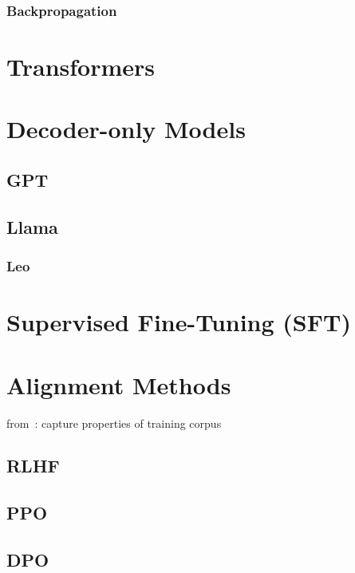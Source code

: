 \subsubsection{Backpropagation}

\section{Transformers}\label{sec:trans}

\section{Decoder-only Models}\label{sec:decoder}

\subsection{GPT}\label{subsec:gpt}

\subsection{Llama}\label{subsec:llama}

\subsubsection{Leo}

\section{Supervised Fine-Tuning (SFT)}\label{sec:supervised-fine-tuning}

\section{Alignment Methods}\label{sec:alignment-methods}
from~\autocite{zhao2023survey}:
capture properties of training corpus

\subsection{RLHF}\label{subsec:rlhf}
\subsection{PPO}\label{subsec:ppo}
\subsection{DPO}\label{subsec:dpo}
